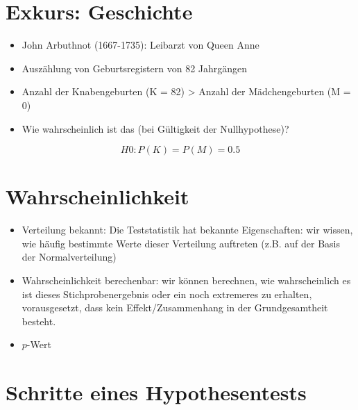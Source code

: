 \documentclass[
]{book}
\providecommand{\tightlist}{%
  \setlength{\itemsep}{0pt}\setlength{\parskip}{0pt}}
\begin{document}
\hypertarget{exkurs-geschichte}{%
\section{Exkurs: Geschichte}\label{exkurs-geschichte}}

\begin{itemize}
\tightlist
\item
  John Arbuthnot (1667-1735): Leibarzt von Queen Anne
\item
  Auszählung von Geburtsregistern von 82 Jahrgängen
\item
  Anzahl der Knabengeburten (K = 82) \textgreater{} Anzahl der Mädchengeburten (M = 0)
\item
  Wie wahrscheinlich ist das (bei Gültigkeit der Nullhypothese)?
\end{itemize}

\[ H0: P(K) = P(M) = 0.5 \]

\hypertarget{wahrscheinlichkeit}{%
\section{Wahrscheinlichkeit}\label{wahrscheinlichkeit}}

\begin{itemize}
\tightlist
\item
  Verteilung bekannt: Die Teststatistik hat bekannte Eigenschaften: wir wissen, wie häufig bestimmte Werte dieser Verteilung auftreten (z.B. auf der Basis der Normalverteilung)
\item
  Wahrscheinlichkeit berechenbar: wir können berechnen, wie wahrscheinlich es ist dieses Stichprobenergebnis oder ein noch extremeres zu erhalten, vorausgesetzt, dass kein Effekt/Zusammenhang in der Grundgesamtheit besteht.
\item
  \(p\)-Wert
\end{itemize}

\hypertarget{schritte-eines-hypothesentests}{%
\section{Schritte eines Hypothesentests}\label{schritte-eines-hypothesentests}}
\end{document}
